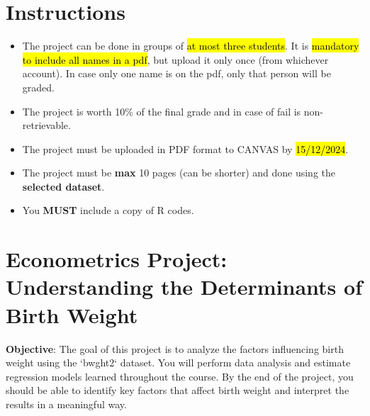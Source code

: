 \documentclass[11pt,a4paper,english]{article}
\begin{document}
\section*{Instructions}
\begin{itemize}
\item The project can be done in groups of \hl{at most three students}. It is \hl{mandatory to include all names in a pdf}, but upload it only once (from whichever account). In case only one name is on the pdf, only that person will be graded.

\item The project is worth 10\% of the final grade and in case of fail is non-retrievable.

\item The project must be uploaded in PDF format to CANVAS by \hl{15/12/2024}. 

\item The project must be \textbf{max} 10 pages (can be shorter) and done using the \textbf{selected dataset}. 

\item You \textbf{MUST} include a copy of R codes.

\end{itemize}

\newpage
\section*{Econometrics Project: Understanding the Determinants of Birth Weight}

\textbf{Objective}: The goal of this project is to analyze the factors influencing birth weight using the `bwght2` dataset. You will perform data analysis and estimate regression models learned throughout the course. By the end of the project, you should be able to identify key factors that affect birth weight and interpret the results in a meaningful way.
\end{document}
